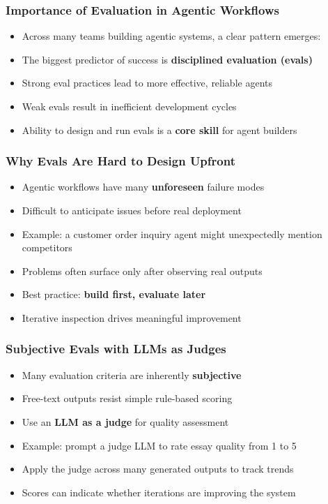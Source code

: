 \begin{frame}[fragile]\frametitle{Importance of Evaluation in Agentic Workflows}
      \begin{itemize}
        \item Across many teams building agentic systems, a clear pattern emerges:
        \item The biggest predictor of success is \textbf{disciplined evaluation (evals)}
        \item Strong eval practices lead to more effective, reliable agents
        \item Weak evals result in inefficient development cycles
        \item Ability to design and run evals is a \textbf{core skill} for agent builders
      \end{itemize}
\end{frame}

\begin{frame}[fragile]\frametitle{Why Evals Are Hard to Design Upfront}
      \begin{itemize}
        \item Agentic workflows have many \textbf{unforeseen} failure modes
        \item Difficult to anticipate issues before real deployment
        \item Example: a customer order inquiry agent might unexpectedly mention competitors
        \item Problems often surface only after observing real outputs
        \item Best practice: \textbf{build first, evaluate later}
        \item Iterative inspection drives meaningful improvement
      \end{itemize}
\end{frame}

\begin{frame}[fragile]\frametitle{Subjective Evals with LLMs as Judges}
      \begin{itemize}
        \item Many evaluation criteria are inherently \textbf{subjective}
        \item Free-text outputs resist simple rule-based scoring
        \item Use an \textbf{LLM as a judge} for quality assessment
        \item Example: prompt a judge LLM to rate essay quality from 1 to 5
        \item Apply the judge across many generated outputs to track trends
        \item Scores can indicate whether iterations are improving the system
      \end{itemize}
\end{frame}

